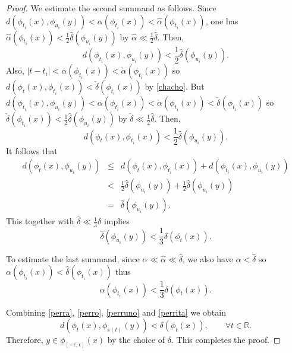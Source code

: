 \documentclass[10pt,a4paper]{amsart}
\begin{document}
\begin{proof}
We estimate the second summand as follows.
Since $d(\phi_{t_i}(x),\phi_{u_i}(y))<\alpha(\phi_{t_i}(x))<\hat{\alpha}(\phi_{t_i}(x))$,
one has $\hat{\alpha}(\phi_{t_i}(x))<\frac{1}2\hat{\delta}(\phi_{u_i}(y))$
by $\hat{\alpha}\ll\frac{1}2\hat{\delta}$. Then,
$$
d(\phi_{t_i}(x),\phi_{u_i}(y))<\frac{1}2\hat{\delta}(\phi_{u_i}(y)).
$$
Also,
$|t-t_i|<\alpha(\phi_{t_i}(x))<\check{\alpha}(\phi_{t_i}(x))$ so
$
d(\phi_t(x),\phi_{t_i}(x))<\check{\delta}(\phi_{t_i}(x))
$
by \eqref{chacho}. But $d(\phi_{t_i}(x),\phi_{u_i}(y))<\alpha(\phi_{t_i}(x))<\check{\alpha}(\phi_{t_i}(x))<\check{\delta}(\phi_{t_i}(x))$ so
$\check{\delta}(\phi_{t_i}(x))<\frac{1}2\hat{\delta}(\phi_{u_i}(y))$ by $\check{\delta}\ll\frac{1}2\hat{\delta}$. Then,
$$
d(\phi_t(x),\phi_{t_i}(x))<\frac{1}2\hat{\delta}(\phi_{u_i}(y)).
$$
It follows that
\begin{eqnarray*}
d(\phi_t(x),\phi_{u_i}(y))&\leq& d(\phi_t(x),\phi_{t_i}(x))+d(\phi_{t_i}(x),\phi_{u_i}(y))\\
&<& \frac{1}2\hat{\delta}(\phi_{u_i}(y))+\frac{1}2\hat{\delta}(\phi_{u_i}(y))\\
&=& \hat{\delta}(\phi_{u_i}(y)).
\end{eqnarray*}
This together with $\hat{\delta}\ll\frac{1}3\delta$ implies
\begin{equation}
\label{perruno}
\hat{\delta}(\phi_{u_i}(y))<\frac{1}3\delta(\phi_t(x)).
\end{equation}

To estimate the last summand, since $\alpha\ll\hat{\alpha}\ll\hat{\delta}$, we also have
$\alpha<\hat{\delta}$ so
$\alpha(\phi_{t_i}(x))<\hat{\delta}(\phi_{t_i}(x))$ thus
\begin{equation}
\label{perrita}
\alpha(\phi_{t_i}(x))<\frac{1}3\delta(\phi_t(x)).
\end{equation}

Combining \eqref{perra}, \eqref{perro}, \eqref{perruno} and \eqref{perrita} we obtain
$$
d(\phi_t(x),\phi_{s(t)}(y))<\delta(\phi_t(x)),\quad\quad\forall 
t\in \mathbb{R}.
$$
Therefore, $y\in \phi_{[-\epsilon,\epsilon]}(x)$ by the choice of $\delta$.
This completes the proof.
\end{proof}
\end{document}
